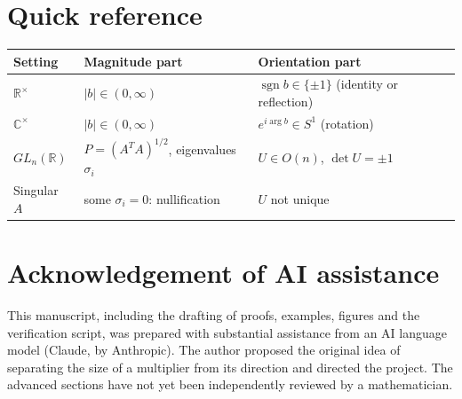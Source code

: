 \documentclass[12pt]{article}
\theoremstyle{definition}
\theoremstyle{remark}
\newcommand{\R}{\mathbb{R}}
\newcommand{\C}{\mathbb{C}}
\newcommand{\sgn}{\operatorname{sgn}}
\begin{document}
\section{Quick reference}
\begin{center}
\begin{tabular}{@{}lll@{}}
\toprule
Setting & Magnitude part & Orientation part\\\midrule
$\R^{\times}$ & $|b|\in(0,\infty)$ & $\sgn b\in\{\pm1\}$ (identity or reflection)\\
$\C^{\times}$ & $|b|\in(0,\infty)$ & $e^{i\arg b}\in S^1$ (rotation)\\
$GL_n(\R)$ & $P=(A^TA)^{1/2}$, eigenvalues $\sigma_i$ & $U\in O(n)$, $\det U=\pm1$\\
Singular $A$ & some $\sigma_i=0$: nullification & $U$ not unique\\\bottomrule
\end{tabular}
\end{center}

\section*{Acknowledgement of AI assistance}
This manuscript, including the drafting of proofs, examples, figures and the verification script, was prepared with substantial assistance from an AI language model (Claude, by Anthropic). The author proposed the original idea of separating the size of a multiplier from its direction and directed the project. The advanced sections have not yet been independently reviewed by a mathematician.



\end{document}
